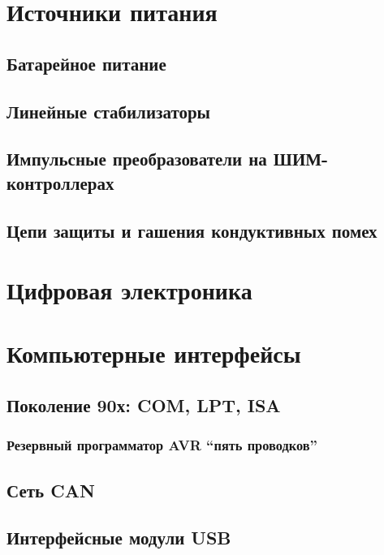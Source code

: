\chapter{Источники питания}

\section{Батарейное питание}

\section{Линейные стабилизаторы}

\section{Импульсные преобразователи на ШИМ-контроллерах} 

\section{Цепи защиты и гашения кондуктивных помех}

\chapter{Цифровая электроника}

\chapter{Компьютерные интерфейсы}

\section{Поколение 90х: COM, LPT, ISA}

\subsection{Резервный программатор AVR ``пять проводков''}

\section{Сеть CAN}

\section{Интерфейсные модули USB}

